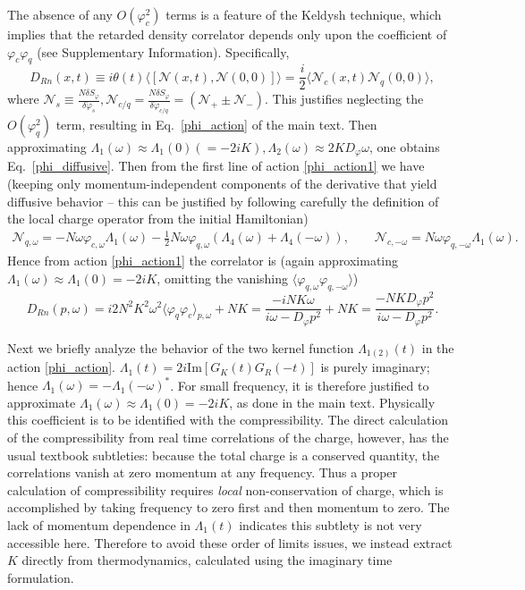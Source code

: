 \documentclass[twocolumn,floatfix,superscriptaddress]{revtex4-1}
\newcommand{\ket}{\rangle}
\newcommand{\bra}{\langle}
\begin{document}
\begin{widetext}
The absence of any $O(\varphi_c^2)$ terms is a feature of the Keldysh technique, which implies that the retarded density correlator depends only upon the coefficient of $\varphi_c\varphi_q$ (see Supplementary Information).  Specifically, 
\begin{equation}
D_{Rn}(x,t)\equiv i\theta(t)\bra[\mathcal N(x,t),\mathcal N(0,0)]\ket =\frac{i}{2}\bra \mathcal N_c(x,t)\mathcal N_q(0,0)\ket,
\end{equation}
where $\mathcal N_s\equiv \frac{N\delta S_\varphi}{\delta \dot\varphi_s}, \mathcal N_{c/q}=\frac{N\delta S_\varphi}{\delta \dot\varphi_{c/q}}=(\mathcal N_+\pm\mathcal N_-)$.   This justifies neglecting the $O(\varphi_q^2)$ term, resulting in Eq.~\eqref{phi_action} of the main text.  Then approximating $\Lambda_1(\omega)\approx \Lambda_1(0)(=-2iK), \Lambda_2(\omega)\approx 2KD_{\varphi} \omega$, one obtains Eq.~\eqref{phi_diffusive}.    Then from the first line of action \eqref{phi_action1} we have (keeping only momentum-independent components of the derivative \cite{davidson_2016} that yield diffusive behavior -- this can be justified by following carefully the definition of the local charge operator from the initial Hamiltonian)
\begin{eqnarray}
\mathcal N_{q,\omega}= -N\omega \varphi_{c,\omega}\Lambda_1(\omega)-\frac{1}{2}N\omega \varphi_{q,\omega}(\Lambda_4(\omega)+\Lambda_4(-\omega)),\qquad \mathcal N_{c,-\omega}=N\omega \varphi_{q,-\omega}\Lambda_1(\omega).
\end{eqnarray}
Hence from action \eqref{phi_action1} the correlator is (again approximating $\Lambda_1(\omega)\approx \Lambda_1(0)=-2iK$, omitting the vanishing $\bra \varphi_{q,\omega}\varphi_{q,-\omega}\ket$)
\begin{equation}
D_{Rn}(p,\omega)=i2N^2K^2\omega^2 \bra \varphi_q\varphi_c\ket_{p,\omega}+NK=\frac{-iNK\omega}{i\omega-D_\varphi p^2}+NK=\frac{-NKD_{\varphi}p^2}{i\omega-D_{\varphi}p^2}.
\end{equation}
 
Next we briefly analyze the behavior of the two kernel function $\Lambda_{1(2)}(t)$ in the action \eqref{phi_action}. 
$\Lambda_1(t)=2i\text{Im}[G_K(t)G_R(-t)]$
 is purely imaginary; hence $\Lambda_1(\omega)=-\Lambda_1(-\omega)^*$.  For small frequency, it is therefore justified to approximate $\Lambda_1(\omega)\approx\Lambda_1(0)=-2iK$, as done in the main text.   Physically this coefficient is to be identified with the compressibility\cite{davidson_2016}.  The direct calculation of the compressibility from real time correlations of the charge, however, has the usual textbook subtleties: because the total charge is a conserved quantity, the correlations vanish at zero momentum at any frequency.  Thus a proper calculation of compressibility requires {\em local} non-conservation of charge, which is accomplished by taking frequency to zero first and then momentum to zero.  The lack of momentum dependence in $\Lambda_1(t)$ indicates this subtlety is not very accessible here.  Therefore  to avoid these order of limits issues, we instead extract $K$ directly from thermodynamics, calculated using the imaginary time formulation. 


\end{widetext}
\end{document}
